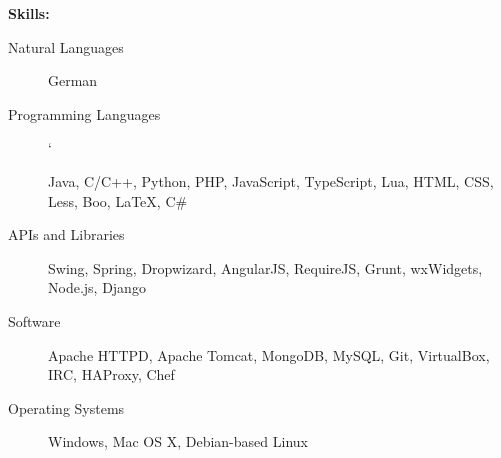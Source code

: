\documentclass[11pt]{article}
\begin{document}
\smallskip
{\Large \textbf{Skills:}}
\hrulefill
\smallskip
\begin{description}
\item[Natural Languages]
\hfill

German

\item[Programming Languages]
\hfill`

Java, C/C++, Python, PHP, JavaScript, TypeScript, Lua, HTML, CSS, Less,  Boo, LaTeX, C\#

\item[APIs and Libraries]
\hfill

Swing, Spring, Dropwizard, AngularJS, RequireJS, Grunt, wxWidgets, Node.js, Django

\item[Software]
\hfill

Apache HTTPD, Apache Tomcat, MongoDB, MySQL, Git, VirtualBox, IRC, HAProxy, Chef

\item[Operating Systems]
\hfill

Windows, Mac OS X, Debian-based Linux
\end{description}
\end{document}
